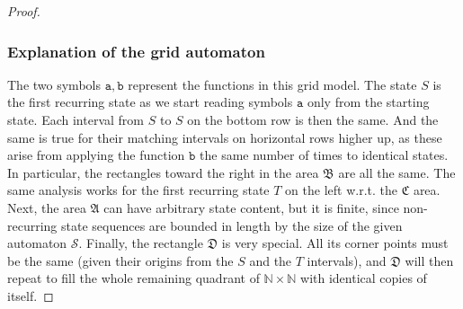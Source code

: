 \documentclass[12pt,oneside,reqno]{amsart}
\theoremstyle{definition}
\begin{document}
\begin{proof}
\begin{center}
 \end{center}
\subsubsection*{Explanation of the grid automaton} The two  symbols $\mathtt{a},\mathtt{b}$ represent the functions in this grid model. The state $S$ is the first recurring state as we start reading symbols $\mathtt{a}$ only from the starting state. Each interval from $S$ to $S$ on the bottom row is then the same. And the same is true for their matching intervals on horizontal rows higher up, as these arise from applying the function $\mathtt{b}$ the same number of times to identical states. In particular, the rectangles toward the right in the area $\mathfrak{B}$ are all the same. The same analysis works for the first recurring state $T$ on the left w.r.t. the $\mathfrak{C}$ area. Next, the area $\mathfrak{A}$ can have arbitrary state content, but it is finite, since non-recurring state sequences are bounded in length by the size of the given automaton $\mathcal{S}$. Finally, the rectangle $\mathfrak{D}$ is very special. All its corner points must be the same (given their origins from the $S$ and the $T$ intervals), and $\mathfrak{D}$ will then repeat to fill the whole remaining quadrant of $\mathbb{N} \times \mathbb{N}$ with identical copies of itself.  \vspace{1ex}


\end{proof}
\end{document}
